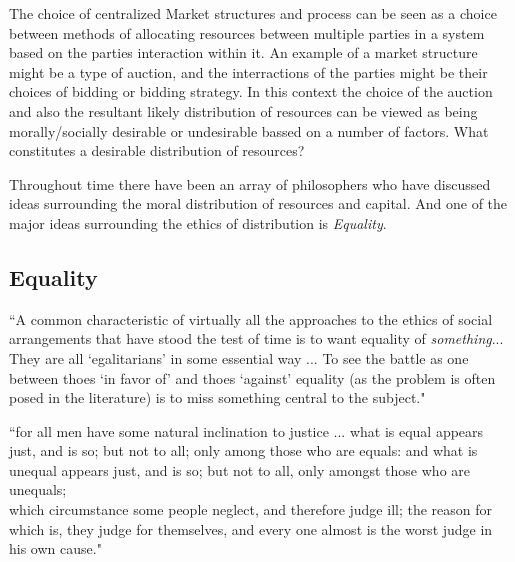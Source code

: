 The choice of centralized Market structures and process can be seen as a choice between methods of allocating resources between multiple parties in a system based on the parties interaction within it.
An example of a market structure might be a type of auction, and the interractions of the parties might be their choices of bidding or bidding strategy.
In this context the choice of the auction and also the resultant likely distribution of resources can be viewed as being morally/socially desirable or undesirable bassed on a number of factors.
What constitutes a desirable distribution of resources?


Throughout time there have been an array of philosophers who have discussed ideas surrounding the moral distribution of resources and capital. And one of the major ideas surrounding the ethics of distribution is \textit{Equality}.

\subsection{Equality}

\begin{displayquote}
``A common characteristic of virtually all the approaches to the ethics of social arrangements that have stood the test of time is to want equality of \textit{something}... They are all `egalitarians' in some essential way ... To see the battle as one between thoes `in favor of' and thoes `against' equality (as the problem is often posed in the literature) is to miss something central to the subject."\cite[Chapter 1]{18084} 
\end{displayquote}

\begin{displayquote}
``for all men have some natural inclination to justice ... what is equal appears just, and is so; but not to all; only among those who are equals: and what is unequal appears just, and is so; but not to all, only amongst those who are unequals;\\
which circumstance some people neglect, and therefore judge ill; the reason for which is, they judge for themselves, and every one almost is the worst judge in his own cause." \cite[Politics, chapter III.9]{AristotleGutenberg}
\end{displayquote}


